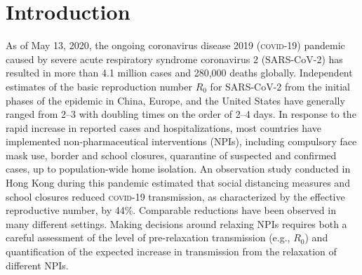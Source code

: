 \section{Introduction}
As of May 13, 2020, the ongoing coronavirus disease 2019 (\textsc{covid}-19) pandemic caused by severe acute respiratory syndrome coronavirus 2 (SARS-CoV-2) has resulted in more than 4.1 million cases and 280,000 deaths globally\cite{WHO:WHOSituationReport:2020}. Independent estimates of the basic reproduction number $R_0$ for SARS-CoV-2 from the initial phases of the epidemic in China, Europe, and the United States have generally ranged from 2–3\cite{Riou:PatternEarlyHumantohuman:2020} with doubling times on the order of 2–4 days. In response to the rapid increase in reported cases and hospitalizations, most countries have implemented non-pharmaceutical interventions (NPIs), including compulsory face mask use, border and school closures, quarantine of suspected and confirmed cases, up to population-wide home isolation\cite{HITCOVIDTeam:HealthInterventionsTracking:2020}. An observation study conducted in Hong Kong during this pandemic estimated that social distancing measures and school closures reduced \textsc{covid}-19 transmission, as characterized by the effective reproductive number, by 44\%\cite{Cowling:ImpactAssessmentNonpharmaceutical:2020}. Comparable reductions have been observed in many different settings\cite{Flaxman:Report13Estimating:2020}. Making decisions around relaxing NPIs requires both a careful assessment of the level of pre-relaxation transmission (e.g., $R_0$) and quantification of the expected increase in transmission from the relaxation of different NPIs. 


